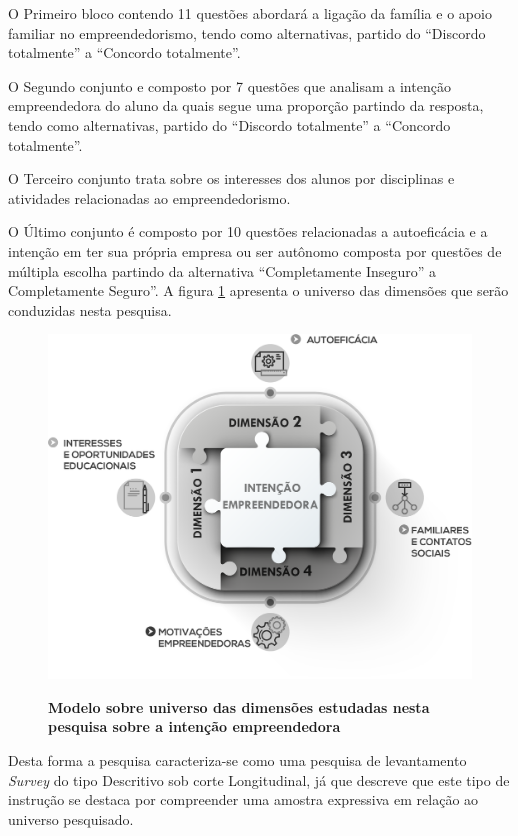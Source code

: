 O Primeiro bloco contendo 11 questões abordará a ligação da família e o apoio familiar no empreendedorismo, tendo como alternativas, partido do “Discordo totalmente” a “Concordo totalmente”.

O Segundo conjunto e composto por 7 questões que analisam a intenção empreendedora do aluno da quais segue uma proporção partindo da resposta, tendo como alternativas, partido do “Discordo totalmente” a “Concordo totalmente”.

O Terceiro conjunto trata sobre os interesses dos alunos por disciplinas e atividades relacionadas ao empreendedorismo.

O Último conjunto é composto por 10 questões relacionadas a autoeficácia e a intenção em ter sua própria empresa ou ser autônomo composta por questões de múltipla escolha partindo da alternativa “Completamente Inseguro” a Completamente Seguro”. A figura \ref{figura_9} apresenta o universo das dimensões que serão conduzidas nesta pesquisa.


\begin{figure}[!htb]
\centering
\caption{\textbf{Modelo sobre universo das dimensões estudadas nesta pesquisa sobre a intenção empreendedora}}
\includegraphics[scale=0.3]{Imagens/intencao_empreendedora.png}
\label{figura_9}
\end{figure}
\newpage

Desta forma a pesquisa caracteriza-se como uma pesquisa de levantamento \textit{Survey} do tipo Descritivo sob corte Longitudinal, já que  descreve que este tipo de instrução se destaca por compreender uma amostra expressiva em relação ao universo pesquisado. 

